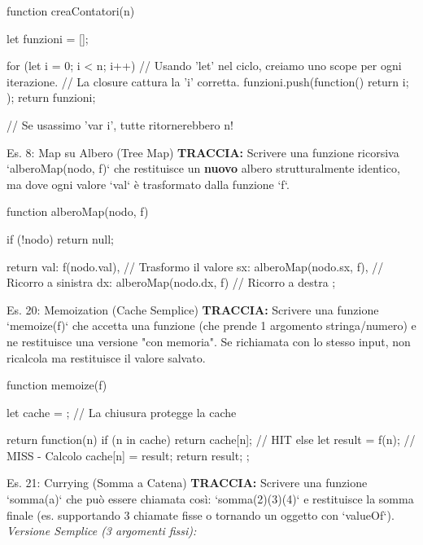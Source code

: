 \begin{jsbox}
function creaContatori(n) {
    let funzioni = [];
    
    for (let i = 0; i < n; i++) {
        // Usando 'let' nel ciclo, creiamo uno scope per ogni iterazione.
        // La closure cattura la 'i' corretta.
        funzioni.push(function() {
            return i;
        });
    }
    return funzioni;
}

// Se usassimo 'var i', tutte ritornerebbero n!
\end{jsbox}

\begin{esercizio}{Es. 8: Map su Albero (Tree Map)}
\textbf{TRACCIA:} Scrivere una funzione ricorsiva `alberoMap(nodo, f)` che restituisce un \textbf{nuovo} albero strutturalmente identico, ma dove ogni valore `val` è trasformato dalla funzione `f`.
\end{esercizio}

\begin{jsbox}
function alberoMap(nodo, f) {
    if (!nodo) return null;
    
    return {
        val: f(nodo.val),           // Trasformo il valore
        sx: alberoMap(nodo.sx, f),  // Ricorro a sinistra
        dx: alberoMap(nodo.dx, f)   // Ricorro a destra
    };
}
\end{jsbox}

\begin{esercizio}{Es. 20: Memoization (Cache Semplice)}
\textbf{TRACCIA:} Scrivere una funzione `memoize(f)` che accetta una funzione (che prende 1 argomento stringa/numero) e ne restituisce una versione "con memoria". Se richiamata con lo stesso input, non ricalcola ma restituisce il valore salvato.
\end{esercizio}

\begin{jsbox}
function memoize(f) {
    let cache = {}; // La chiusura protegge la cache
    
    return function(n) {
        if (n in cache) {
            return cache[n]; // HIT
        } else {
            let result = f(n); // MISS - Calcolo
            cache[n] = result;
            return result;
        }
    };
}
\end{jsbox}

\begin{esercizio}{Es. 21: Currying (Somma a Catena)}
\textbf{TRACCIA:} Scrivere una funzione `somma(a)` che può essere chiamata così: `somma(2)(3)(4)` e restituisce la somma finale (es. supportando 3 chiamate fisse o tornando un oggetto con `valueOf`).
\textit{Versione Semplice (3 argomenti fissi):}
\end{esercizio}

